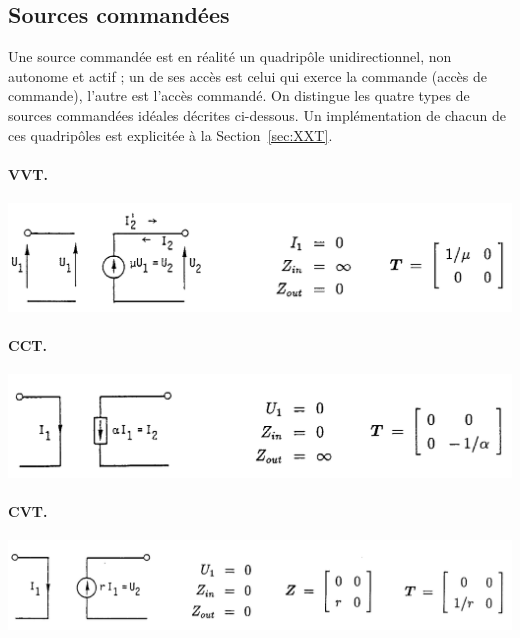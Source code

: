 \subsection{Sources commandées}

Une source commandée est en réalité un quadripôle unidirectionnel, non autonome et actif ; un
de ses accès est celui qui exerce la commande (accès de commande), l'autre est l'accès
commandé. On distingue les quatre types de sources commandées idéales décrites ci-dessous. Un implémentation de chacun de ces quadripôles est explicitée à la Section~\ref{sec:XXT}.

\paragraph{VVT.}
\begin{center}
\includegraphics[width=0.9\linewidth]{figs/QP/QP_VVT}
\end{center}

\paragraph{CCT.}
\begin{center}
	\includegraphics[width=0.9\linewidth]{figs/QP/QP_CCT}
\end{center}

\paragraph{CVT.}
\begin{center}
	\includegraphics[width=0.9\linewidth]{figs/QP/QP_CVT}
\end{center}

